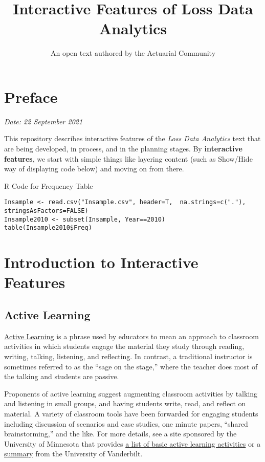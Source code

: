 \documentclass[
]{book}
\title{Interactive Features of Loss Data Analytics}
\author{An open text authored by the Actuarial Community}
\date{}
\begin{document}
\maketitle

{
\setcounter{tocdepth}{2}
\tableofcontents
}
\hypertarget{preface}{%
\chapter*{Preface}\label{preface}}

\emph{Date: 22 September 2021}

This repository describes interactive features of the \emph{Loss Data Analytics} text that are being developed, in process, and in the planning stages. By \textbf{interactive features}, we start with simple things like layering content (such as Show/Hide way of displaying code below) and moving on from there.

R Code for Frequency Table

\hypertarget{display.T:Frequency.2Intro}{}
\begin{verbatim}
Insample <- read.csv("Insample.csv", header=T,  na.strings=c("."), stringsAsFactors=FALSE)
Insample2010 <- subset(Insample, Year==2010)
table(Insample2010$Freq)
\end{verbatim}

\hypertarget{introduction-to-interactive-features}{%
\chapter{Introduction to Interactive Features}\label{introduction-to-interactive-features}}

\hypertarget{active-learning}{%
\section{Active Learning}\label{active-learning}}

\href{https://cei.umn.edu/support-services/tutorials/what-active-learning}{Active Learning} is a phrase used by educators to mean an approach to classroom activities in which students engage the material they study through reading, writing, talking, listening, and reflecting. In contrast, a traditional instructor is sometimes referred to as the ``sage on the stage,'' where the teacher does most of the talking and students are passive.

Proponents of active learning suggest augmenting classroom activities by talking and listening in small groups, and having students write, read, and reflect on material. A variety of classroom tools have been forwarded for engaging students including discussion of scenarios and case studies, one minute papers, ``shared brainstorming,'' and the like. For more details, see a site sponsored by the University of Minnesota that provides \href{https://cei.umn.edu/active-learning}{a list of basic active learning activities} or a \href{https://cft.vanderbilt.edu/active-learning/}{summary} from the University of Vanderbilt.
\end{document}
